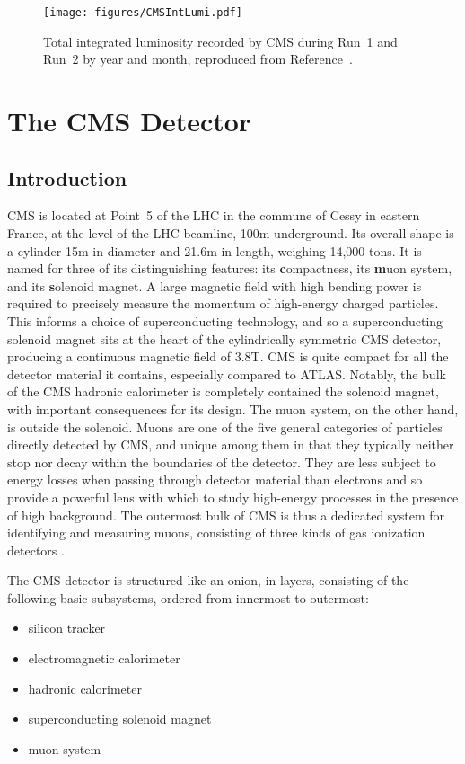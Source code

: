 \begin{figure}[tpb]
  \centering
  \texttt{[image: figures/CMSIntLumi.pdf]}
  \caption{Total \pp integrated luminosity recorded by CMS during Run~1 and Run~2 by year and month, reproduced from Reference~\cite{LumiTwiki}.}
  \label{cms:totallumi}
\end{figure}

\section{The CMS Detector}
\subsection{Introduction}
\label{cms:intro}
CMS is located at Point~5 of the LHC in the commune of Cessy in eastern France, at the level of the LHC beamline, 100\unit{m} underground.
Its overall shape is a cylinder 15\unit{m} in diameter and 21.6\unit{m} in length, weighing 14,000 tons.
It is named for three of its distinguishing features: its \textbf{c}ompactness, its \textbf{m}uon system, and its \textbf{s}olenoid magnet.
A large magnetic field with high bending power is required to precisely measure the momentum of high-energy charged particles.
This informs a choice of superconducting technology, and so a superconducting solenoid magnet sits at the heart of the cylindrically symmetric CMS detector, producing a continuous magnetic field of 3.8\unit{T}.
CMS is quite compact for all the detector material it contains, especially compared to ATLAS.
Notably, the bulk of the CMS hadronic calorimeter is completely contained the solenoid magnet, with important consequences for its design.
The muon system, on the other hand, is outside the solenoid.
Muons are one of the five general categories of particles directly detected by CMS, and unique among them in that they typically neither stop nor decay within the boundaries of the detector.
They are less subject to energy losses when passing through detector material than electrons and so provide a powerful lens with which to study high-energy processes in the presence of high background.
The outermost bulk of CMS is thus a dedicated system for identifying and measuring muons, consisting of three kinds of gas ionization detectors \cite{Chatrchyan:2008zzk}.

The CMS detector is structured like an onion, in layers, consisting of the following basic subsystems, ordered from innermost to outermost:
\begin{itemize}
  \item silicon tracker
  \item electromagnetic calorimeter
  \item hadronic calorimeter
  \item superconducting solenoid magnet
  \item muon system
\end{itemize}

